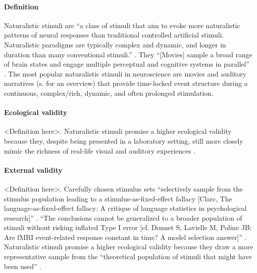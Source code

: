 \paragraph{Definition}

Naturalistic stimuli are ``a class of stimuli that aim to evoke more
naturalistic patterns of neural responses than traditional controlled artificial
stimuli. Naturalistic paradigms are typically complex and dynamic, and longer in
duration than many conventional stimuli.'' \citep{vanderwal2019movies}.
%
They ``[Movies] sample a broad range of brain states and engage multiple
perceptual and cognitive systems in parallel'' \citep{haxby2020naturalistic}.
The most popular naturalistic stimuli in neuroscience are movies and auditory
narratives (s. \citep{jaaskelainen2021movies, jaaskelainen2020neural} for an
overview) that provide time-locked event structure during a continuous,
complex/rich, dynamic, and often prolonged stimulation.


\paragraph{Ecological validity}
<Definition here>.
Naturalistic stimuli promise a higher ecological validity \citep{zaki2009need,
hasson2012future, hamilton2018revolution} because they, despite being presented
in a laboratory setting, still more closely mimic the richness of real-life
visual and auditory experiences \citep{hasson2008neurocinematics,
haxby2020naturalistic}.

\paragraph{External validity}
<Definition here>.
Carefully chosen stimulus sets ``selectively sample from the stimulus population
leading to a stimulus-as-fixed-effect fallacy [Clarc, The
language-as-fixed-effect fallacy: A critique of language statistics in
psychological research]'' \citep{westfall2016fixing}.
%
``The conclusions cannot be generalized to a broader population of stimuli
without risking inflated Type I error  [cf. Donnet S, Lavielle M, Poline JB: Are
fMRI event-related response constant in time? A model selection
answer]'' \citep{westfall2016fixing}.
%
Naturalistic stimuli promise a higher ecological validity because they draw a
more representative sample from the ``theoretical population of stimuli that
might have been used'' \citep{westfall2016fixing}.


